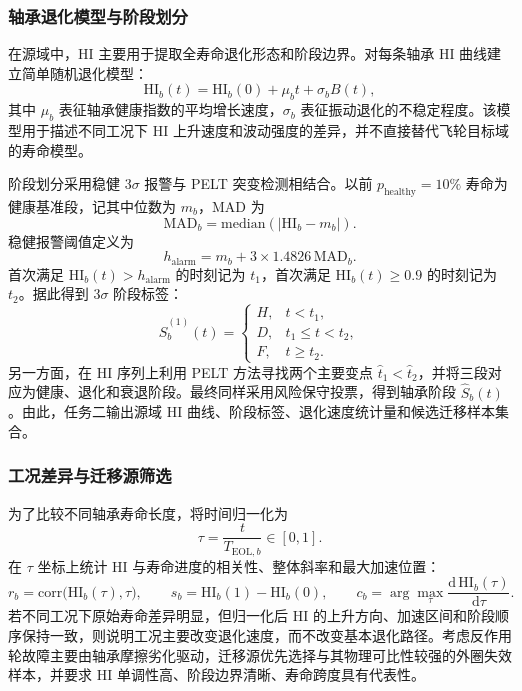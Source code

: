 \subsubsection{轴承退化模型与阶段划分}

在源域中，HI 主要用于提取全寿命退化形态和阶段边界。对每条轴承 HI 曲线建立简单随机退化模型：
\begin{equation}
  \label{eq:q2_hi_wiener}
  \mathrm{HI}_b(t)=\mathrm{HI}_b(0)+\mu_b t+\sigma_b B(t),
\end{equation}
其中 $\mu_b$ 表征轴承健康指数的平均增长速度，$\sigma_b$ 表征振动退化的不稳定程度。该模型用于描述不同工况下 HI 上升速度和波动强度的差异，并不直接替代飞轮目标域的寿命模型。

阶段划分采用稳健 3$\sigma$ 报警与 PELT 突变检测相结合。以前 $p_{\mathrm{healthy}}=10\%$ 寿命为健康基准段，记其中位数为 $m_b$，MAD 为
\begin{equation}
  \mathrm{MAD}_b=\mathrm{median}\left(|\mathrm{HI}_b-m_b|\right).
\end{equation}
稳健报警阈值定义为
\begin{equation}
  \label{eq:q2_alarm}
  h_{\mathrm{alarm}}=m_b+3\times1.4826\,\mathrm{MAD}_b.
\end{equation}
首次满足 $\mathrm{HI}_b(t)>h_{\mathrm{alarm}}$ 的时刻记为 $t_1$，首次满足 $\mathrm{HI}_b(t)\ge0.9$ 的时刻记为 $t_2$。据此得到 3$\sigma$ 阶段标签：
\begin{equation}
  \label{eq:q2_stage_sigma}
  \hat S_b^{(1)}(t)=
  \begin{cases}
  H, & t<t_1,\\
  D, & t_1\le t<t_2,\\
  F, & t\ge t_2.
  \end{cases}
\end{equation}
另一方面，在 HI 序列上利用 PELT 方法寻找两个主要变点 $\hat t_1<\hat t_2$，并将三段对应为健康、退化和衰退阶段。最终同样采用风险保守投票，得到轴承阶段 $\hat S_b(t)$。由此，任务二输出源域 HI 曲线、阶段标签、退化速度统计量和候选迁移样本集合。

\subsubsection{工况差异与迁移源筛选}

为了比较不同轴承寿命长度，将时间归一化为
\begin{equation}
  \label{eq:q2_tau}
  \tau=\frac{t}{T_{\mathrm{EOL},b}}\in[0,1].
\end{equation}
在 $\tau$ 坐标上统计 HI 与寿命进度的相关性、整体斜率和最大加速位置：
\begin{equation}
  r_b=\mathrm{corr}\bigl(\mathrm{HI}_b(\tau),\tau\bigr),
  \qquad
  s_b=\mathrm{HI}_b(1)-\mathrm{HI}_b(0),
  \qquad
  c_b=\arg\max_\tau \frac{\mathrm d\,\mathrm{HI}_b(\tau)}{\mathrm d\tau}.
\end{equation}
若不同工况下原始寿命差异明显，但归一化后 HI 的上升方向、加速区间和阶段顺序保持一致，则说明工况主要改变退化速度，而不改变基本退化路径。考虑反作用轮故障主要由轴承摩擦劣化驱动，迁移源优先选择与其物理可比性较强的外圈失效样本，并要求 HI 单调性高、阶段边界清晰、寿命跨度具有代表性。

